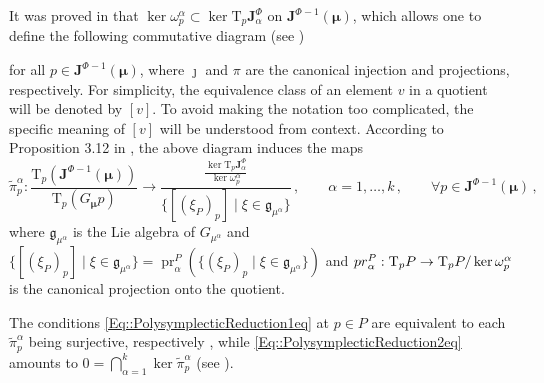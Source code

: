 \documentclass[11pt]{article}
\theoremstyle{plain}
\theoremstyle{definition}
\newcommand{\T}{\mathrm{T}}
\newcommand{\bfJ}{\mathbf{J}}
\DeclareMathOperator{\pr}{pr}
\numberwithin{equation}{section}
\begin{document}
It was proved in \cite{MRSV_15} that $\ker\omega_p^\alpha\subset \ker \T_p\mathbf{J}^\Phi_\alpha$ on $\mathbf{J}^{\Phi-1}(\bm\mu)$, which allows one to define the following commutative diagram (see \cite[pg. 12]{MRSV_15})
\begin{center}
\end{center}
for all $p\in\mathbf{J}^{\Phi-1}(\bm\mu)$, where $\jmath$ and $\pi$ are the canonical injection and projections, respectively. For simplicity, the equivalence class of an element $v$ in a quotient will be denoted by $[v]$. To avoid making the notation too complicated, the specific meaning of $[v]$ will be understood from context. According to Proposition 3.12 in \cite{MRSV_15}, the above diagram induces the maps
$$
    \widetilde{\pi}_p^\alpha:\frac{\T_p(\mathbf{J}^{\Phi-1}(\bm\mu))}{\T_p(G_{\bm\mu} p)}\longrightarrow \frac{\frac{\ker \T_p\mathbf{J}^\Phi_\alpha}{\ker \omega_p^\alpha}}{\{[ (\xi_P)_p]\mid\xi\in \mathfrak{g}_{\mu^\alpha}\}}\,,\qquad \alpha=1,\ldots,k\,,\qquad \forall p\in\mathbf{J}^{\Phi-1}(\bm\mu)\,,
$$
where $\mathfrak{g}_{\mu^\alpha}$ is the Lie algebra of $G_{\mu^\alpha}$ and $\{[ (\xi_P)_p]\mid\xi\in \mathfrak{g}_{\mu^\alpha}\}=\pr^{P}_\alpha(\{ (\xi_P)_p\mid\xi\in \mathfrak{g}_{\mu^\alpha}\})$ and ${\rm pr}^P_\alpha:\T_pP\rightarrow \T_pP/\ker \omega_p^\alpha$ is the canonical projection onto the quotient.

The conditions \eqref{Eq::PolysymplecticReduction1eq} at $p\in P$ are equivalent to each $\widetilde{\pi}_p^\alpha$ being surjective, respectively \cite[Lemma 3.15]{MRSV_15}, while \eqref{Eq::PolysymplecticReduction2eq} amounts to $0=\bigcap_{\alpha=1}^k\ker \widetilde{\pi}_p^\alpha$ (see \cite[Lemma 3.16]{MRSV_15}).
\end{document}
